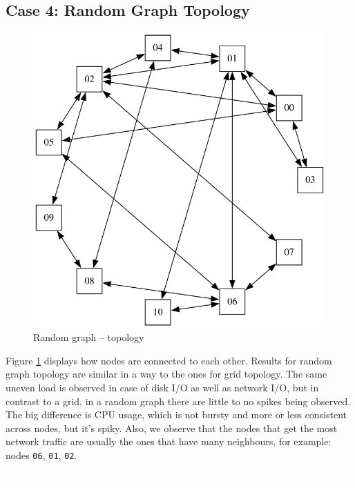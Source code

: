 \newpage
\subsection{Case 4: Random Graph Topology}

\begin{figure}
\centering
\captionsetup{justification=centering,width=0.8\linewidth}
\includegraphics[width=0.7\linewidth]{figures/topologies/graph-random.png}
\caption{Random graph -- topology}
\label{fig:graph-random-topology}
\end{figure}

Figure \ref{fig:graph-random-topology} displays how nodes are connected to each
other. Results for random graph topology are similar in a way to the ones for
grid topology. The same uneven load is observed in case of disk I/O as well as
network I/O, but in contrast to a grid, in a random graph there are little to
no spikes being observed. The big difference is CPU usage, which is not bursty
and more or less consistent across nodes, but it's spiky. Also, we observe that
the nodes that get the most network traffic are usually the ones that have many
neighbours, for example: nodes \verb|06|, \verb|01|, \verb|02|.

\textcolor{white}{.}\\
\\
\\
\\
\\
\\

